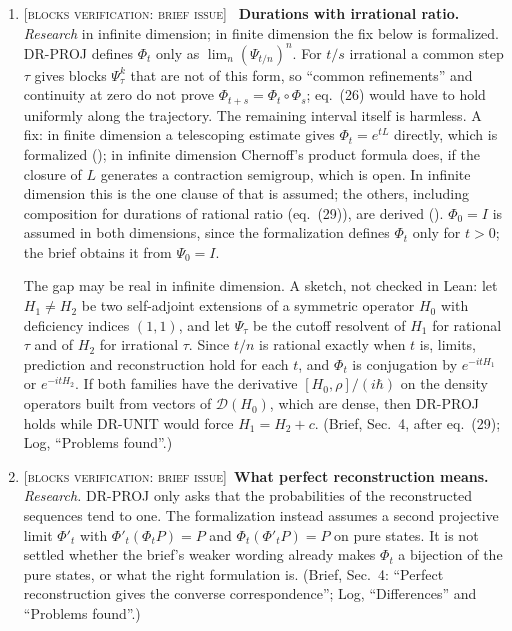 \documentclass[11pt]{article}
\newcommand{\blocker}[1]{\textsc{[blocks verification: #1]}~}
\begin{document}
\begin{enumerate}
\item \blocker{brief issue}
  \textbf{Durations with irrational ratio.} \emph{Research} in
  infinite dimension; in finite dimension the fix below is formalized.
  DR-PROJ defines $\Phi_t$ only as
  $\lim_n(\Psi_{t/n})^n$. For $t/s$ irrational a common step $\tau$ gives blocks $\Psi_\tau^k$ that
  are not of this form, so ``common refinements'' and continuity at zero do not prove
  $\Phi_{t+s} = \Phi_t\circ\Phi_s$; eq.~(26) would have to hold uniformly along the trajectory.
  The remaining interval itself is harmless. A fix: in finite dimension a telescoping estimate
  gives $\Phi_t = e^{tL}$ directly, which is formalized ();
  in infinite dimension Chernoff's product formula does, if the closure of $L$ generates a
  contraction semigroup, which is open. In infinite dimension this is the one clause of
   that is assumed; the others, including composition for durations of
  rational ratio (eq.~(29)), are derived (). $\Phi_0 = I$ is
  assumed in both dimensions, since the formalization defines $\Phi_t$ only for $t > 0$; the brief
  obtains it from $\Psi_0 = I$.

  The gap may be real in infinite dimension. A sketch, not checked in Lean: let $H_1 \ne H_2$ be
  two self-adjoint extensions of a symmetric operator $H_0$ with deficiency indices $(1,1)$, and let
  $\Psi_\tau$ be the cutoff resolvent of $H_1$ for rational $\tau$ and of $H_2$ for irrational
  $\tau$. Since $t/n$ is rational exactly when $t$ is, limits, prediction and reconstruction hold
  for each $t$, and $\Phi_t$ is conjugation by $e^{-itH_1}$ or $e^{-itH_2}$. If both families have
  the derivative $[H_0,\rho]/(i\hbar)$ on the density operators built from vectors of
  $\mathcal{D}(H_0)$, which are dense, then DR-PROJ holds while DR-UNIT would force
  $H_1 = H_2 + c$. (Brief, Sec.~4, after eq.~(29); Log, ``Problems found''.)
\item \blocker{brief issue}\textbf{What perfect reconstruction means.} \emph{Research.}
  DR-PROJ only asks that the probabilities of
  the reconstructed sequences tend to one. The formalization instead assumes a second projective
  limit $\Phi'_t$ with $\Phi'_t(\Phi_t P) = P$ and $\Phi_t(\Phi'_t P) = P$ on pure states. It is
  not settled whether the brief's weaker wording already makes $\Phi_t$ a bijection of the pure
  states, or what the right formulation is. (Brief, Sec.~4: ``Perfect reconstruction gives the
  converse correspondence''; Log, ``Differences'' and ``Problems found''.)
\end{enumerate}
\end{document}
